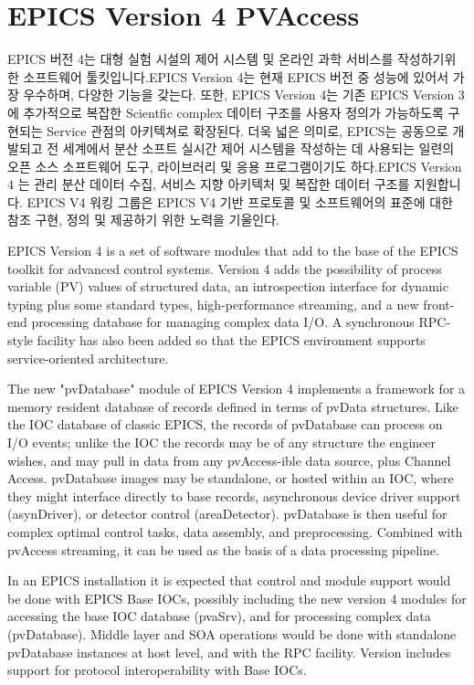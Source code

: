 \documentclass[11pt
  , a4paper
  , article
  , oneside
]{memoir}
\begin{document}
\section{EPICS Version 4 PVAccess}
EPICS 버전 4는 대형 실험 시설의 제어 시스템 및 온라인 과학 서비스를 작성하기위한 소프트웨어 툴킷입니다.EPICS Version 4는 현재 EPICS 버전 중 성능에 있어서 가장 우수하며, 다양한 기능을 갖는다. 또한, EPICS Version 4는 기존 EPICS Version 3에 추가적으로 복잡한 Scientfic complex 데이터 구조를 사용자 정의가 가능하도록 구현되는 Service 관점의 아키텍쳐로 확장된다. 더욱 넓은 의미로, EPICS는 공동으로 개발되고 전 세계에서 분산 소프트 실시간 제어 시스템을 작성하는 데 사용되는 일련의 오픈 소스 소프트웨어 도구, 라이브러리 및 응용 프로그램이기도 하다.EPICS Version 4 는 관리 분산 데이터 수집, 서비스 지향 아키텍처 및 복잡한 데이터 구조를 지원합니다. EPICS V4 워킹 그룹은 EPICS V4 기반 프로토콜 및 소프트웨어의 표준에 대한 참조 구현, 정의 및 제공하기 위한  노력을 기울인다.

EPICS Version 4 is a set of software modules that add to the base of the EPICS toolkit for advanced control systems. Version 4 adds the possibility of process variable (PV) values of structured data, an introspection interface for dynamic typing plus some standard types, high-performance streaming, and a new front-end processing database for managing complex data I/O. A synchronous RPC-style facility has also been added so that the EPICS environment supports service-oriented architecture.

The new "pvDatabase" module of EPICS Version 4 implements a framework for a memory resident database of records defined in terms of pvData structures. Like the IOC database of classic EPICS, the records of pvDatabase can process on I/O events; unlike the IOC the records may be of any structure the engineer wishes, and may pull in data from any pvAccess-ible data source, plus Channel Access. pvDatabase images may be standalone, or hosted within an IOC, where they might interface directly to base records, asynchronous device driver support (asynDriver), or detector control (areaDetector). pvDatabase is then useful for complex optimal control tasks, data assembly, and preprocessing. Combined with pvAccess streaming, it can be used as the basis of a data processing pipeline.

In an EPICS installation it is expected that control and module support would be done with EPICS Base IOCs, possibly including the new version 4 modules for accessing the base IOC database (pvaSrv), and for processing complex data (pvDatabase). Middle layer and SOA operations would be done with standalone pvDatabase instances at host level, and with the RPC facility. Version includes support for protocol interoperability with Base IOCs.
\end{document}
